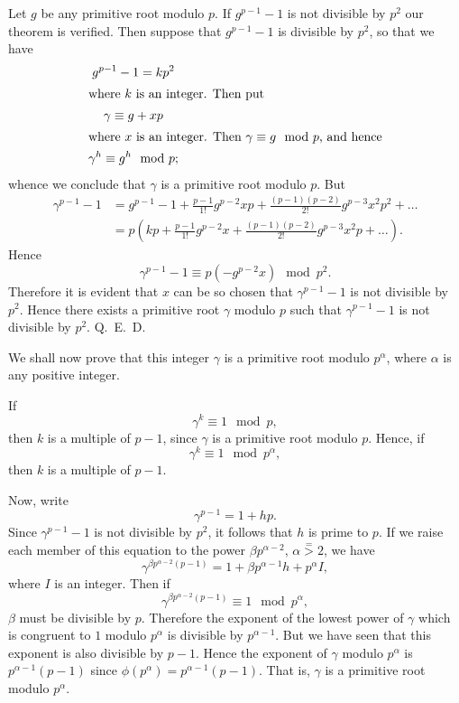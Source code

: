 \documentclass[oneside]{book}
\begin{document}
Let $g$ be any primitive root modulo $p$. If $g^{p-1}-1$ is not
divisible by $p^2$ our theorem is verified. Then suppose that
$g^{p-1}-1$ is divisible by $p^2$, so that we have
\begin{gather*}
g^{p-1}-1 = kp^2 \\
\intertext{where $k$ is an integer. Then put}
\gamma \equiv g + xp \\
\intertext{where $x$ is an integer. Then $\gamma \equiv g \mod p$, and
hence}
\gamma^h \equiv g^h \mod p;
\end{gather*}
whence we conclude that $\gamma$ is a primitive root modulo $p$. But
\begin{align*}
\gamma^{p-1}-1 &=
     g^{p-1} - 1 + \frac{p-1}{1!}g^{p-2}xp +
        \frac{(p-1)(p-2)}{2!}g^{p-3}x^2p^2 + \ldots \\
  &= p\left(kp + \frac{p-1}{1!}g^{p-2}x +
        \frac{(p-1)(p-2)}{2!}g^{p-3}x^2p + \ldots\right).
\end{align*}
Hence
\begin{equation*}
\gamma^{p-1}-1 \equiv p(-g^{p-2}x) \mod p^2.
\end{equation*}
Therefore it is evident that $x$ can be so chosen that
$\gamma^{p-1}-1$ is not divisible by $p^2$. Hence there exists a
primitive root $\gamma$ modulo $p$ such that $\gamma^{p-1}-1$ is not
divisible by $p^2$. Q.~E.~D.

\smallskip We shall now prove that this integer $\gamma$ is a
primitive root modulo $p^\alpha$, where $\alpha$ is any positive
integer.

If
\begin{equation*}
\gamma^k \equiv 1\mod p,
\end{equation*}
then $k$ is a multiple of $p-1$, since $\gamma$ is a primitive root
modulo $p$. Hence, if
\begin{equation*}
\gamma^k \equiv 1 \mod p^\alpha,
\end{equation*}
then $k$ is a multiple of $p-1$.

Now, write
\begin{equation*}
\gamma^{p-1} = 1 + hp.
\end{equation*}
Since $\gamma^{p-1}-1$ is not divisible by $p^2$, it follows that $h$
is prime to $p$. If we raise each member of this equation to the
power $\beta p^{\alpha-2}$, $\alpha \stackrel{=}{>}2$, we have
\begin{equation*}
\gamma^{\beta p^{\alpha-2}(p-1)} =
  1 + \beta p^{\alpha-1}h + p^\alpha I,
\end{equation*}
where $I$ is an integer. Then if
\begin{equation*}
\gamma^{\beta p^{\alpha-2}(p-1)} \equiv 1 \mod p^\alpha,
\end{equation*}
$\beta$ must be divisible by $p$. Therefore the exponent of the
lowest power of $\gamma$ which is congruent to $1$ modulo $p^\alpha$
is divisible by $p^{\alpha-1}$. But we have seen that this exponent
is also divisible by $p-1$. Hence the exponent of $\gamma$ modulo
$p^\alpha$ is $p^{\alpha-1}(p-1)$ since $\phi(p^\alpha) =
p^{\alpha-1}(p-1)$. That is, $\gamma$ is a primitive root modulo
$p^\alpha$.
\end{document}
